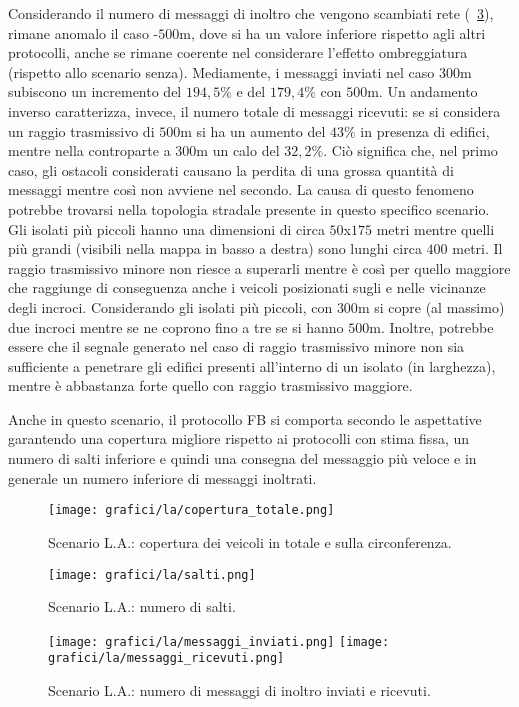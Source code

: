 Considerando il numero di messaggi di inoltro che vengono scambiati rete (\figurename~\ref{fig:risultati-la-messaggi}),
rimane anomalo il caso \statica{}-$500$m, dove si ha un valore inferiore rispetto agli altri protocolli,
anche se rimane coerente nel considerare l'effetto ombreggiatura (rispetto allo scenario senza).
Mediamente, i messaggi inviati nel caso $300$m subiscono un incremento del $194,5\%$ e del $179,4\%$
con $500$m.
Un andamento inverso caratterizza, invece, il numero totale di messaggi ricevuti:
se si considera un raggio trasmissivo di $500$m si ha un aumento del $43\%$ in presenza di edifici,
mentre nella controparte a $300$m un calo del $32,2\%$.
Ciò significa che, nel primo caso, gli ostacoli considerati causano la perdita di una grossa quantità di messaggi
mentre così non avviene nel secondo.
La causa di questo fenomeno potrebbe trovarsi nella topologia stradale presente in questo specifico scenario.
Gli isolati più piccoli hanno una dimensioni di circa $50$x$175$ metri mentre quelli più grandi
(visibili nella mappa in basso a destra) sono lunghi circa $400$ metri.
Il raggio trasmissivo minore non riesce a superarli mentre è così per quello maggiore che raggiunge
di conseguenza anche i veicoli posizionati sugli e nelle vicinanze degli incroci.
Considerando gli isolati più piccoli, con $300$m si copre (al massimo) due incroci mentre se ne coprono
fino a tre se si hanno $500$m.
Inoltre, potrebbe essere che il segnale generato nel caso di raggio trasmissivo minore
non sia sufficiente a penetrare gli edifici presenti all'interno di un isolato (in larghezza),
mentre è abbastanza forte quello con raggio trasmissivo maggiore.

Anche in questo scenario, il protocollo FB si comporta secondo le aspettative
garantendo una copertura migliore %
rispetto ai protocolli con stima fissa,
un numero di salti inferiore e quindi una consegna del messaggio più veloce
e in generale un numero inferiore di messaggi inoltrati.
%
\begin{figure}[htbp]
	\centering
		\texttt{[image: grafici/la/copertura\_totale.png]}
\caption{Scenario L.A.: copertura dei veicoli in totale e sulla circonferenza.\label{fig:risultati-la-copertura}}
\end{figure}
%
\begin{figure}[htbp]
	\centering
		\texttt{[image: grafici/la/salti.png]}
\caption{Scenario L.A.: numero di salti.\label{fig:risultati-la-salti}}
\end{figure}
%
\begin{figure}[htbp]
	\centering
		\texttt{[image: grafici/la/messaggi\_inviati.png]}
		\texttt{[image: grafici/la/messaggi\_ricevuti.png]}
\caption{Scenario L.A.: numero di messaggi di inoltro inviati e ricevuti.\label{fig:risultati-la-messaggi}}
\end{figure}
\clearpage
%
%
